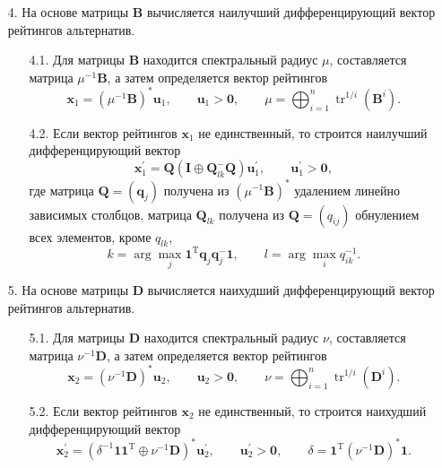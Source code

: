 \documentclass[specialist, substylefile = spbureport.rtx,
               subf,href,colorlinks=true, 12pt]{disser}
\begin{document}
\begin{itemize}
        
        \item[4.]
        На основе матрицы $\bm{B}$ вычисляется наилучший дифференцирующий вектор рейтингов альтернатив.
        \begin{itemize}
            \item[4.1.]
            Для матрицы $\bm{B}$ находится спектральный радиус $\mu$, составляется матрица $\mu^{-1}\bm{B}$, а затем определяется вектор рейтингов
            $$
            \bm{x}_{1} = (\mu^{-1}\bm{B})^{\ast}\bm{u}_{1},
            \qquad
            \bm{u}_{1} > \bm{0},
            \qquad
            \mu = \bigoplus_{i=1}^{n}{\mathop\mathrm{tr}}^{1/i}(\bm{B}^{i}).
            $$
            \item[4.2.]
            Если вектор рейтингов $\bm{x}_{1}$ не единственный, то строится наилучший дифференцирующий вектор
            $$
            \bm{x}_{1}^{\prime} =
            \bm{Q}(\bm{I}\oplus\bm{Q}_{lk}^{-}\bm{Q})
            \bm{u}_{1}^{\prime},
            \qquad
            \bm{u}_{1}^{\prime} > \bm{0},
            $$
            где матрица $\bm{Q}=(\bm{q}_{j})$ получена из $(\mu^{-1}\bm{B})^{\ast}$ удалением линейно зависимых столбцов, матрица $\bm{Q}_{lk}$ получена из $\bm{Q}=(q_{ij})$ обнулением всех элементов, кроме $q_{lk}$, 
            $$
            k = \arg\max_{j}\bm{1}^{\mathrm{T}}\bm{q}_{j}\bm{q}_{j}^{-}\bm{1},
            \qquad
            l = \arg\max_{i}q_{ik}^{-1}.
            $$
        \end{itemize}
        \item[5.]
        На основе матрицы $\bm{D}$ вычисляется наихудший дифференцирующий вектор рейтингов альтернатив.
        \begin{itemize}
            \item[5.1.]
            Для матрицы $\bm{D}$ находится спектральный радиус $\nu$, составляется матрица $\nu^{-1}\bm{D}$, а затем определяется вектор рейтингов
            $$
            \bm{x}_{2} =
            (\nu^{-1}\bm{D})^{\ast}\bm{u}_{2},
            \qquad
            \bm{u}_{2} > \bm{0},
            \qquad
            \nu
            =
            \bigoplus_{i=1}^{n}{\mathop\mathrm{tr}}^{1/i}(\bm{D}^{i}).
            $$
            \item[5.2.]
            Если вектор рейтингов $\bm{x}_{2}$ не единственный, то строится наихудший дифференцирующий вектор
            $$
            \bm{x}_{2}^{\prime} =
            (\delta^{-1}\bm{1}\bm{1}^{\mathrm{T}}\oplus\nu^{-1}\bm{D})^{\ast}
            \bm{u}_{2}^{\prime},
            \qquad
            \bm{u}_{2}^{\prime} > \bm{0},
            \qquad
            \delta =
            \bm{1}^{\mathrm{T}}(\nu^{-1}\bm{D})^{\ast}\bm{1}.
            $$
        \end{itemize}
        
    \end{itemize}
\end{document}
